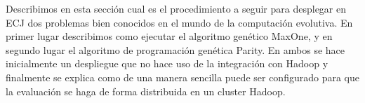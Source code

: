 Describimos en esta sección cual es el procedimiento a seguir para desplegar en ECJ dos problemas bien conocidos en el mundo de la computación evolutiva. En primer lugar describimos como ejecutar el algoritmo genético MaxOne, y en segundo lugar el algoritmo de programación genética Parity. En ambos se hace inicialmente un despliegue que no hace uso de la integración con Hadoop y finalmente se explica como de una manera sencilla puede ser configurado para que la evaluación se haga de forma distribuida en un cluster Hadoop.